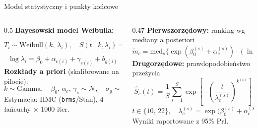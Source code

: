 \documentclass[aspectratio=169, 12pt]{beamer}
\begin{document}
\begin{frame}{Model statystyczny i punkty końcowe}
    \begin{columns}
        \begin{column}{0.5\textwidth}
            \textbf{Bayesowski model Weibulla:}
            \[
                T_i \sim \mathrm{Weibull}(k,\, \lambda_i), \quad
                S(t \mid k, \lambda_i) = \exp\!\left[-\!\left(\tfrac{t}{\lambda_i}\right)^{\!k}\right]
            \]
            \[
                \log \lambda_i = \beta_0 + \alpha_{c(i)} + \gamma_{s(i)} + b_{g(i)}
            \]
            \vspace{0.2em}
            \textbf{Rozkłady a priori} (skalibrowane na pilocie):
            \[
                k \sim \mathrm{Gamma},\quad \beta_0,\,\alpha_c,\,\gamma_s \sim \mathcal{N},\quad \sigma_g \sim \mathrm{HN}
            \]
            Estymacja: HMC (\texttt{brms}/Stan), 4 łańcuchy $\times$ 1000 iter.
        \end{column}
        \begin{column}{0.47\textwidth}
            \textbf{Pierwszorzędowy:} ranking wg mediany a posteriori
            \[
                \tilde{m}_c = \mathrm{med}_s\bigl\{\exp(\beta_0^{(s)}\!+\alpha_c^{(s)})\cdot(\ln 2)^{1/k^{(s)}}\bigr\}
            \]
            \textbf{Drugorzędowe:} prawdopodobieństwo przeżycia
            \[
                \hat{S}_c(t) = \frac{1}{S}\sum_{s=1}^{S} \exp\!\left[-\!\left(\frac{t}{\lambda_c^{(s)}}\right)^{\!k^{(s)}}\right]
            \]
            \[
                t \in \{10,\,22\},\quad \lambda_c^{(s)} = \exp\!\bigl(\beta_0^{(s)}\!+\alpha_c^{(s)}\bigr)
            \]
            \footnotesize Wyniki raportowane z 95\% PrI.
        \end{column}
    \end{columns}
\end{frame}
\end{document}
